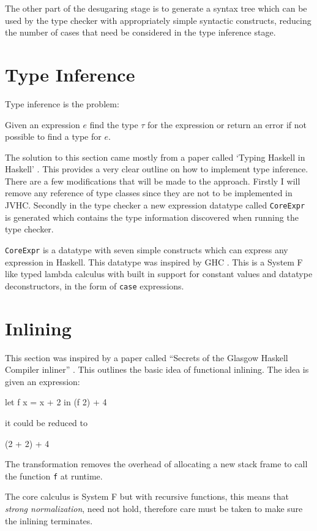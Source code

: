 \documentclass[float=false, crop=false]{standalone}
\begin{document}
The other part of the desugaring stage is to generate a syntax tree which can be used by the type checker
with appropriately simple syntactic constructs, reducing the number of cases that need
be considered in the type inference stage.

\section{Type Inference}

Type inference is the problem:
\begin{displayquote}
Given an expression $e$ find the type $\tau$ for the expression or return an error if not possible to
find a type for $e$.
\end{displayquote}
The solution to this section came mostly from a paper called `Typing Haskell in Haskell' \cite{thih-paper}. 
This provides a very clear outline on how to implement type inference. 
There are a few modifications that will be made to the approach.
Firstly I will remove any reference of type classes since they are not to be implemented in JVHC.
Secondly in the type checker a new expression datatype called \texttt{CoreExpr} 
is generated which contains the type information discovered when running the type checker.

\texttt{CoreExpr} is a datatype with seven simple constructs which can express any expression in Haskell.
This datatype was inspired by GHC \cite{typedcorelink}. This is a System F like typed lambda calculus with
built in support for constant values and datatype deconstructors, in the form of \texttt{case} expressions.

\section{Inlining}

This section was inspired by a paper called ``Secrets of the 
Glasgow Haskell Compiler inliner'' \cite{ghc-inliner}. This outlines the basic idea of functional 
inlining. The idea is given an expression:
\begin{HaskellLst}
let f x = x + 2 in 
  (f 2) + 4
\end{HaskellLst}
it could be reduced to
\begin{HaskellLst}
(2 + 2) + 4
\end{HaskellLst}
The transformation removes the overhead of allocating a new stack frame to call 
the function \texttt{f} at runtime.

The core calculus is System F but with recursive functions, 
this means that \textit{strong normalization}, 
need not hold, therefore care must be taken to make sure the inlining terminates.
\end{document}
